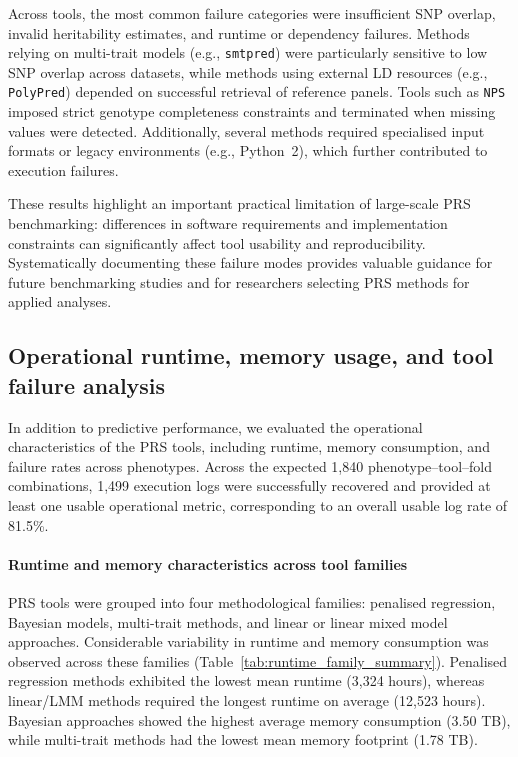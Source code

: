 \documentclass[pdflatex,sn-basic]{sn-jnl}
\begin{document}
Across tools, the most common failure categories were insufficient SNP overlap, invalid heritability estimates, and runtime or dependency failures. Methods relying on multi-trait models (e.g., \texttt{smtpred}) were particularly sensitive to low SNP overlap across datasets, while methods using external LD resources (e.g., \texttt{PolyPred}) depended on successful retrieval of reference panels. Tools such as \texttt{NPS} imposed strict genotype completeness constraints and terminated when missing values were detected. Additionally, several methods required specialised input formats or legacy environments (e.g., Python~2), which further contributed to execution failures.

These results highlight an important practical limitation of large-scale PRS benchmarking: differences in software requirements and implementation constraints can significantly affect tool usability and reproducibility. Systematically documenting these failure modes provides valuable guidance for future benchmarking studies and for researchers selecting PRS methods for applied analyses.


\subsection{Operational runtime, memory usage, and tool failure analysis}

In addition to predictive performance, we evaluated the operational characteristics of the PRS tools, including runtime, memory consumption, and failure rates across phenotypes. Across the expected 1,840 phenotype–tool–fold combinations, 1,499 execution logs were successfully recovered and provided at least one usable operational metric, corresponding to an overall usable log rate of 81.5\%.

\paragraph{Runtime and memory characteristics across tool families}

PRS tools were grouped into four methodological families: penalised regression, Bayesian models, multi-trait methods, and linear or linear mixed model approaches. Considerable variability in runtime and memory consumption was observed across these families (Table~\ref{tab:runtime_family_summary}). Penalised regression methods exhibited the lowest mean runtime (3,324 hours), whereas linear/LMM methods required the longest runtime on average (12,523 hours). Bayesian approaches showed the highest average memory consumption (3.50 TB), while multi-trait methods had the lowest mean memory footprint (1.78 TB).
\end{document}
